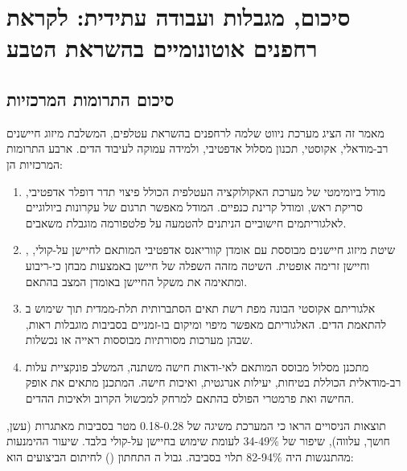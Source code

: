 

\section{סיכום, מגבלות ועבודה עתידית: לקראת רחפנים אוטונומיים בהשראת הטבע}
\label{sec:ch09_conclusion}

\subsection{סיכום התרומות המרכזיות}
\label{sec:ch09_contributions}

מאמר זה הציג מערכת ניווט שלמה לרחפנים בהשראת עטלפים, המשלבת מיזוג חיישנים רב-מודאלי,  אקוסטי, תכנון מסלול אדפטיבי, ולמידה עמוקה לעיבוד הדים. ארבע התרומות המרכזיות הן:

\begin{enumerate}
    \item מודל ביומימטי של מערכת האקולוקציה העטלפית הכולל פיצוי תדר דופלר אדפטיבי, סריקת ראש, ומודל קרינת כנפיים. המודל מאפשר תרגום של עקרונות ביולוגיים לאלגוריתמים חישוביים הניתנים להטמעה על פלטפורמה מוגבלת משאבים.
    \item שיטת מיזוג חיישנים מבוססת  עם אומדן קווריאנס אדפטיבי המותאם לחיישן על-קולי, , וחיישן זרימה אופטית. השיטה מזהה השפלה של חיישן באמצעות מבחן כי-ריבוע ומתאימה את משקל החיישן באומדן המצב בהתאם.
    \item אלגוריתם  אקוסטי הבונה מפת רשת תאים הסתברותית תלת-ממדית תוך שימוש ב להתאמת הדים. האלגוריתם מאפשר מיפוי ומיקום בו-זמניים בסביבות מוגבלות ראות, שבהן מערכות  מסורתיות מבוססות ראייה או  נכשלות.
    \item מתכנן מסלול מבוסס  המותאם לאי-ודאות חישה משתנה, המשלב פונקציית עלות רב-מודאלית הכוללת בטיחות, יעילות אנרגטית, ואיכות חישה. המתכנן מתאים את אופק החישה ואת פרמטרי הפולס בהתאם למרחק למכשול הקרוב ולאיכות ההדים. \cite{CrewAIDocs}
\end{enumerate}

תוצאות הניסויים הראו כי המערכת משיגה  של 0.18-0.28 מטר בסביבות מאתגרות (עשן, חושך, עלווה), שיפור של 34-49\% לעומת שימוש בחיישן על-קולי בלבד. שיעור ההימנעות מהתנגשות היה 82-94\% תלוי בסביבה. גבול ה התחתון () לחיתום הביצועים הוא:

